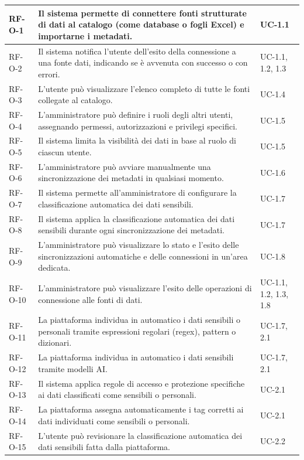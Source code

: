 \begin{longtable}{ p{} p{} p{} }
RF-O-1 & Il sistema permette di connettere fonti strutturate di dati al catalogo (come database o fogli Excel) e importarne i metadati. & UC-1.1 \\ \midrule
RF-O-2 & Il sistema notifica l'utente dell'esito della connessione a una fonte dati, indicando se è avvenuta con successo o con errori. & UC-1.1, 1.2, 1.3 \\ \midrule
RF-O-3 & L'utente può visualizzare l'elenco completo di tutte le fonti collegate al catalogo. & UC-1.4 \\ \midrule
RF-O-4 & L'amministratore può definire i ruoli degli altri utenti, assegnando permessi, autorizzazioni e privilegi specifici. & UC-1.5 \\ \midrule
RF-O-5 & Il sistema limita la visibilità dei dati in base al ruolo di ciascun utente. & UC-1.5 \\ \midrule
RF-O-6 & L'amministratore può avviare manualmente una sincronizzazione dei metadati in qualsiasi momento. & UC-1.6 \\ \midrule
RF-O-7 & Il sistema permette all'amministratore di configurare la classificazione automatica dei dati sensibili. & UC-1.7 \\ \midrule
RF-O-8 & Il sistema applica la classificazione automatica dei dati sensibili durante ogni sincronizzazione dei metadati. & UC-1.7 \\ \midrule
RF-O-9 & L'amministratore può visualizzare lo stato e l'esito delle sincronizzazioni automatiche e delle connessioni in un'area dedicata. & UC-1.8 \\ \midrule
RF-O-10 & L'amministratore può visualizzare l'esito delle operazioni di connessione alle fonti di dati. & UC-1.1, 1.2, 1.3, 1.8 \\ \midrule
RF-O-11 & La piattaforma individua in automatico i dati sensibili o personali tramite espressioni regolari (regex), pattern o dizionari. & UC-1.7, 2.1 \\ \midrule
RF-O-12 & La piattaforma individua in automatico i dati sensibili tramite modelli AI. & UC-1.7, 2.1 \\ \midrule
RF-O-13 & Il sistema applica regole di accesso e protezione specifiche ai dati classificati come sensibili o personali. & UC-2.1 \\ \midrule
RF-O-14 & La piattaforma assegna automaticamente i tag corretti ai dati individuati come sensibili o personali. & UC-2.1 \\ \midrule
RF-O-15 & L'utente può revisionare la classificazione automatica dei dati sensibili fatta dalla piattaforma. & UC-2.2 \\ \midrule

\end{longtable}

